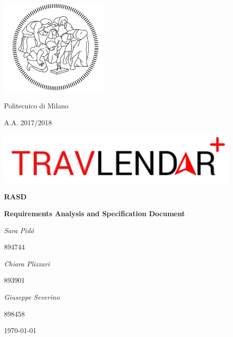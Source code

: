 \documentclass[12pt,titlepage]{article}
\begin{document}
\begin{titlepage}
\centering
\includegraphics[width=0.4\textwidth]{Logo}\par
	{{Politecnico di Milano} \par}
	{{A.A. 2017/2018} \par}
	\vspace{1.5cm}
	\includegraphics[width=0.9\textwidth]{LogoTravlendar}\par
	\vspace{1.5cm}
	{\Huge \textbf {RASD}\par}
	{ \textbf{Requirements Analysis and Specification Document} \par}
	\vspace{1.5cm}
	{\Large\itshape Sara Pid\'o  }{\Large   {  894744}\par}
	{\Large\itshape Chiara Plizzari }{\Large   {  893901}\par}
	{\Large\itshape Giuseppe Severino }{\Large   {  898458}\par}
	\vspace{2cm}
	\vfill
	\pagebreak
	{\large \today \par}
\end{titlepage}




 


\end{document}
